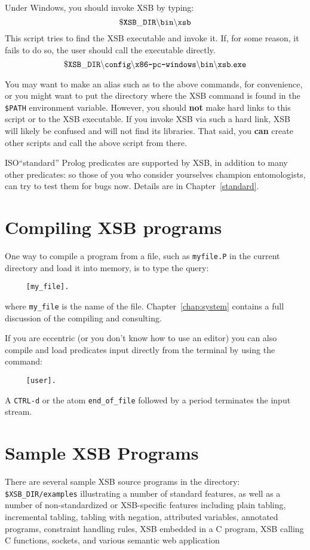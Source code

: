 Under Windows, you should invoke XSB by typing:
\[
 \tt
 \$XSB\_DIR\backslash{}bin\backslash{}xsb
\]
This script tries to find the XSB executable and invoke it. If, for some
reason, it fails to do so, the user should call the executable directly.
\[
 \tt
 \$XSB\_DIR\backslash{}config\backslash\texttt{x86-pc-windows}\backslash{}bin\backslash{}xsb.exe
\]


You may want to make an alias such as {\tt \smallourprolog} to the above
commands, for convenience, or you might want to put the directory where the
XSB command is found in the {\tt \$PATH} environment variable. However, you
should {\bf not} make hard links to this script or to the XSB executable.
If you invoke XSB via such a hard link, XSB will likely be confused and will
not find its libraries.  That said, you {\bf can} create other scripts and
call the above script from there.

ISO``standard'' Prolog predicates are supported by XSB, in addition to
many other predicates: so those of you who consider yourselves
champion entomologists, can try to test them for bugs now.  Details
are in Chapter~\ref{standard}.


\section{Compiling XSB programs}

One way to compile a program from a file, such as {\tt myfile.P} in
the current directory and load it into memory, is to type the query:
\begin{verbatim}
     [my_file].
\end{verbatim}
where \verb'my_file' is the name of the file.
Chapter~\ref{chap:system} contains a full discussion of the compiling
and consulting.

If you are eccentric (or you don't know how to use an editor) you can also 
compile and load predicates input directly from the terminal by using the
command:
\begin{verbatim}
     [user].
\end{verbatim}
A {\tt CTRL-d} or the atom \verb'end_of_file' followed by a period 
terminates the input stream.


\section{Sample XSB Programs}

There are several sample XSB source programs in the directory: {\tt
  \$XSB\_DIR/examples} illustrating a number of standard features, as
well as a number of non-standardized or XSB-specific features
including plain tabling, incremental tabling, tabling with negation,
attributed variables, annotated programs, constraint handling rules,
XSB embedded in a C program, XSB calling C functions, sockets, and
various semantic web application

